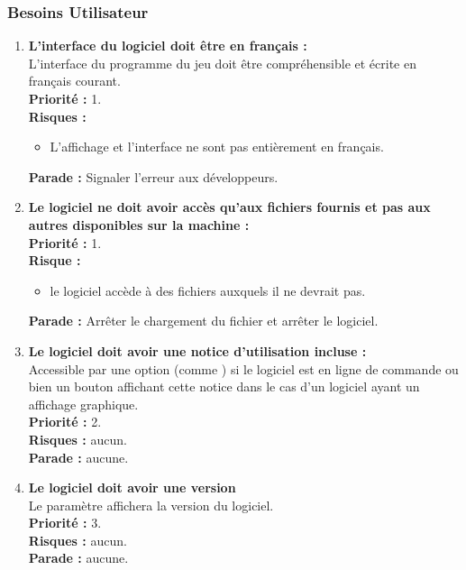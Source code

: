 \subsubsection{Besoins Utilisateur}
\begin{enumerate}

    \item \textbf{L'interface du logiciel doit être en français :} \\
    L'interface du programme du jeu doit être compréhensible et écrite en français courant. \\
    \textbf{Priorité :} 1. \\
    \textbf{Risques :} 
    \begin{itemize}
        \item L'affichage et l'interface ne sont pas entièrement en français. \\
    \end{itemize}
    \textbf{Parade :} Signaler l'erreur aux développeurs.
    
    \item \textbf{Le logiciel ne doit avoir accès qu’aux fichiers fournis et pas aux autres disponibles sur la machine :} \\
    \textbf{Priorité :} 1. \\
    \textbf{Risque :} 
    \begin{itemize}
        \item le logiciel accède à des fichiers auxquels il ne devrait pas.
    \end{itemize}
    \textbf{Parade :} Arrêter le chargement du fichier et arrêter le logiciel.
    
     \item \textbf{Le logiciel doit avoir une notice d'utilisation incluse :} \\
    Accessible par une option (comme ) si le logiciel est en ligne de commande ou bien un bouton affichant cette notice dans le cas d'un logiciel ayant un affichage graphique. \\
    \textbf{Priorité :} 2. \\
    \textbf{Risques :} aucun. \\
    \textbf{Parade :} aucune.
    
    \item \textbf{Le logiciel doit avoir une version} \\
    Le paramètre  affichera la version du logiciel.\\
    \textbf{Priorité :} 3. \\
    \textbf{Risques :} aucun. \\
    \textbf{Parade :} aucune.

\end{enumerate}


